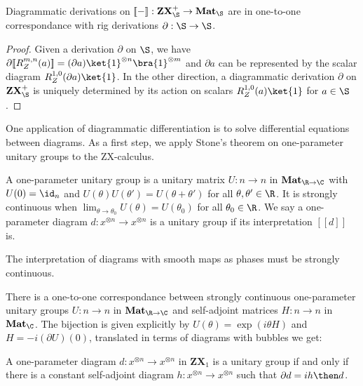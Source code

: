 \begin{theorem}
Diagrammatic derivations on $[\![-]\!] : \mathbf{ZX}_\S^+ \to \mathbf{Mat}_\S$
are in one-to-one correspondance with rig derivations $\partial : \S \to \S$.
\end{theorem}

\begin{proof}
Given a derivation $\partial$ on $\S$, we have
$\partial [\![R_Z^{m, n}(a)]\!]
= (\partial a) \ket{1}^{\otimes n} \bra{1}^{\otimes m}$
and $\partial a$ can be represented by the scalar diagram
$R_Z^{1, 0}(\partial a) \ket{1}$.
In the other direction, a diagrammatic derivation $\partial$ on
$\mathbf{ZX}_\S^+$ is uniquely determined by its action on scalars
$R_Z^{1, 0}(a) \ket{1}$ for $a \in \S$.
\end{proof}

One application of diagrammatic differentiation is to solve
differential equations between diagrams. As a first step,
we apply Stone's theorem \cite{Stone32} on one-parameter unitary groups
to the ZX-calculus.

\begin{definition}
A one-parameter unitary group is a unitary matrix $U : n \to n$
in $\mathbf{Mat}_{\R \to \C}$ with $U(0) = \id_n$ and $U(\theta) U(\theta') = U(\theta + \theta')$
for all $\theta, \theta' \in \R$. It is strongly continuous when
$\lim_{\theta \to \theta_0} U(\theta) = U(\theta_0)$ for all $\theta_0 \in \R$.
We say a one-parameter diagram $d : x^{\otimes n} \to x^{\otimes n}$
is a unitary group if its interpretation $[\![d]\!]$ is.
\end{definition}

\begin{remark}
The interpretation of diagrams with smooth maps as phases must be strongly continuous.
\end{remark}

\begin{theorem}[Stone]
There is a one-to-one correspondance between strongly continuous one-parameter
unitary groups $U : n \to n$ in $\mathbf{Mat}_{\R \to \C}$ and self-adjoint
matrices $H : n \to n$ in $\mathbf{Mat}_{\C}$. The bijection is given
explicitly by $U(\theta) = \exp(i \theta H)$ and $H = - i (\partial U)(0)$,
translated in terms of diagrams with bubbles we get:
\end{theorem}

\begin{corollary}
A one-parameter diagram $d : x^{\otimes n} \to x^{\otimes n}$ in
$\mathbf{ZX}_1$ is a unitary group if and only if there is a constant
self-adjoint diagram
$h : x^{\otimes n} \to x^{\otimes n}$ such that $\partial d = i h \then d$.
\end{corollary}

